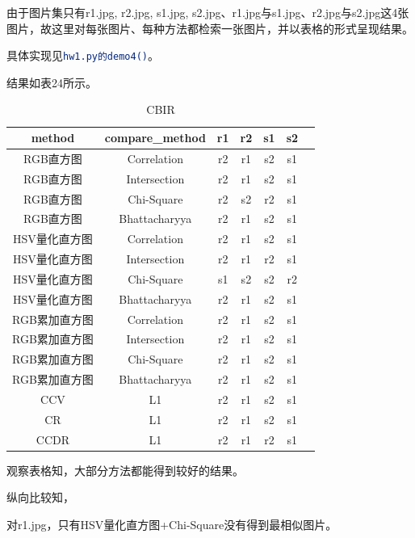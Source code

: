 \documentclass[a4paper, 12pt, UTF8]{article}
\begin{document}
由于图片集只有r1.jpg, r2.jpg, s1.jpg, s2.jpg、r1.jpg与s1.jpg、r2.jpg与s2.jpg这4张图片，故这里对每张图片、每种方法都检索一张图片，并以表格的形式呈现结果。

具体实现见\lstinline[language=bash]{hw1.py的demo4()}。

结果如表24所示。

\begin{table}[h!]
    \centering
    \caption{CBIR}
    \begin{tabular}{ccccccc}
        method & compare_method & r1 & r2 & s1 & s2 \\ \hline
        RGB直方图    & Correlation   & r2 & r1 & s2 & s1 \\ \hline
        RGB直方图    & Intersection  & r2 & r1 & s2 & s1 \\ \hline
        RGB直方图    & Chi-Square    & r2 & s2 & r2 & s1 \\ \hline
        RGB直方图    & Bhattacharyya & r2 & r1 & s2 & s1 \\ \hline
        HSV量化直方图 & Correlation   & r2 & r1 & s2 & s1 \\ \hline
        HSV量化直方图 & Intersection  & r2 & r1 & r2 & s1 \\ \hline
        HSV量化直方图 & Chi-Square    & s1 & s2 & s2 & r2 \\ \hline
        HSV量化直方图 & Bhattacharyya & r2 & r1 & s2 & s1 \\ \hline
        RGB累加直方图 & Correlation   & r2 & r1 & s2 & s1 \\ \hline
        RGB累加直方图 & Intersection  & r2 & r1 & s2 & s1 \\ \hline
        RGB累加直方图 & Chi-Square    & r2 & r1 & s2 & s1 \\ \hline
        RGB累加直方图 & Bhattacharyya & r2 & r1 & s2 & s1 \\ \hline
        CCV         & L1            & r2 & r1 & s2 & s1 \\ \hline
        CR          & L1            & r2 & r1 & s2 & s1 \\ \hline
        CCDR        & L1            & r2 & r1 & r2 & s1 \\ \hline
    \end{tabular}
\end{table}

观察表格知，大部分方法都能得到较好的结果。

纵向比较知，

对r1.jpg，只有HSV量化直方图+Chi-Square没有得到最相似图片。
\end{document}
